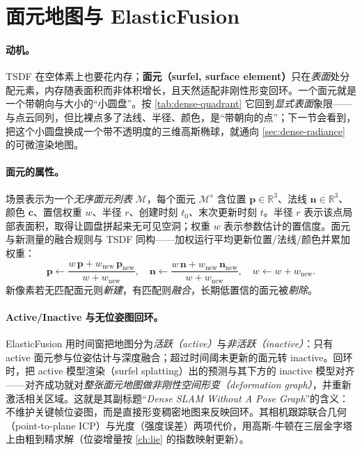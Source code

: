 \section{面元地图与 ElasticFusion}
\label{sec:dense-surfel}

\paragraph{动机。}
TSDF 在空体素上也要花内存；\textbf{面元（surfel, surface element）}只在\emph{表面}处分配元素，内存随表面积而非体积增长，且天然适配非刚性形变回环\cite{whelan2015elasticfusion}。一个面元就是一个带朝向与大小的“小圆盘”。按 \cref{tab:dense-quadrant} 它回到\emph{显式表面}象限——与点云同列，但比裸点多了法线、半径、颜色，是“带朝向的点”；下一节会看到，把这个小圆盘换成一个带不透明度的三维高斯椭球，就通向 \cref{sec:dense-radiance} 的可微渲染地图。

\paragraph{面元的属性。}
场景表示为一个\emph{无序面元列表} $\mathcal{M}$，每个面元 $\mathcal{M}^s$ 含位置 $\mathbf{p}\in\mathbb{R}^3$、法线 $\mathbf{n}\in\mathbb{R}^3$、颜色 $\mathbf{c}$、置信权重 $w$、半径 $r$、创建时刻 $t_0$、末次更新时刻 $t$\cite{whelan2015elasticfusion}。半径 $r$ 表示该点局部表面积，取得让圆盘拼起来无可见空洞；权重 $w$ 表示参数估计的置信度。面元与新测量的融合规则与 TSDF 同构——加权运行平均更新位置/法线/颜色并累加权重\cite{keller2013pointfusion}：
\begin{equation}
  \mathbf{p}\leftarrow\frac{w\,\mathbf{p}+w_{\mathrm{new}}\,\mathbf{p}_{\mathrm{new}}}{w+w_{\mathrm{new}}},\quad
  \mathbf{n}\leftarrow\frac{w\,\mathbf{n}+w_{\mathrm{new}}\,\mathbf{n}_{\mathrm{new}}}{w+w_{\mathrm{new}}},\quad
  w\leftarrow w+w_{\mathrm{new}}.
  \label{eq:dense-surfel-fuse}
\end{equation}
新像素若无匹配面元则\emph{新建}，有匹配则\emph{融合}，长期低置信的面元被\emph{剔除}。

\begin{note}
\end{note}

\paragraph{Active/Inactive 与无位姿图回环。}
ElasticFusion 用时间窗把地图分为\emph{活跃（active）}与\emph{非活跃（inactive）}：只有 active 面元参与位姿估计与深度融合；超过时间阈未更新的面元转 inactive。回环时，把 active 模型渲染（surfel splatting）出的预测与其下方的 inactive 模型对齐——对齐成功就对\emph{整张面元地图做非刚性空间形变（deformation graph）}，并重新激活相关区域。这就是其副标题“\emph{Dense SLAM Without A Pose Graph}”的含义：不维护关键帧位姿图，而是直接形变稠密地图来反映回环。其相机跟踪联合几何（point-to-plane ICP）与光度（强度误差）两项代价，用高斯-牛顿在三层金字塔上由粗到精求解（位姿增量按 \cref{ch:lie} 的指数映射更新）。

